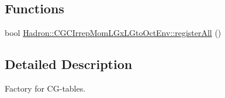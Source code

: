 \subsection*{Functions}
\begin{DoxyCompactItemize}
\item 
bool \mbox{\hyperlink{namespaceHadron_1_1CGCIrrepMomLGxLGtoOctEnv_af4080789e3dc09dd752e71cb20ff3cb7}{Hadron\+::\+C\+G\+C\+Irrep\+Mom\+L\+Gx\+L\+Gto\+Oct\+Env\+::register\+All}} ()
\end{DoxyCompactItemize}


\subsection{Detailed Description}
Factory for C\+G-\/tables. 

